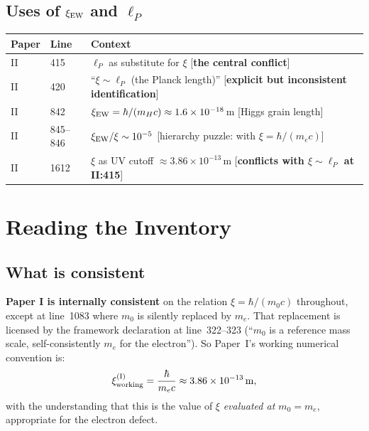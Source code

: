\documentclass[11pt,a4paper]{article}
\begin{document}
\subsection{Uses of $\xi_{\rm EW}$ and $\ell_P$}

\begin{longtable}{@{}llp{9cm}@{}}
\toprule
Paper & Line & Context \\
\midrule
\endhead
II & 415  & $\ell_P$ as substitute for $\xi$ [\textbf{the central conflict}] \\
II & 420  & ``$\xi \sim \ell_P$ (the Planck length)'' [\textbf{explicit but
            inconsistent identification}] \\
II & 842  & $\xi_{\rm EW} = \hbar/(m_H c) \approx 1.6\times 10^{-18}\,$m
            [Higgs grain length] \\
II & 845--846 & $\xi_{\rm EW}/\xi \sim 10^{-5}$
                [hierarchy puzzle: with $\xi = \hbar/(m_e c)$] \\
II & 1612 & $\xi$ as UV cutoff $\approx 3.86\times 10^{-13}\,$m
            [\textbf{conflicts with $\xi \sim \ell_P$ at II:415}] \\
\bottomrule
\end{longtable}

\section{Reading the Inventory}

\subsection{What is consistent}

\textbf{Paper I is internally consistent} on the relation
$\xi = \hbar/(m_0 c)$ throughout, except at line~1083 where $m_0$ is
silently replaced by $m_e$.  That replacement is licensed by the framework
declaration at line~322--323 (``$m_0$ is a reference mass scale, self-consistently
$m_e$ for the electron'').  So Paper~I's working numerical convention is:
\begin{equation*}
    \xi^{\rm (I)}_{\rm working}
      = \frac{\hbar}{m_e c}
      \approx 3.86\times 10^{-13}\,\mathrm{m},
\end{equation*}
with the understanding that this is the value of $\xi$ \emph{evaluated at
$m_0 = m_e$}, appropriate for the electron defect.
\end{document}
